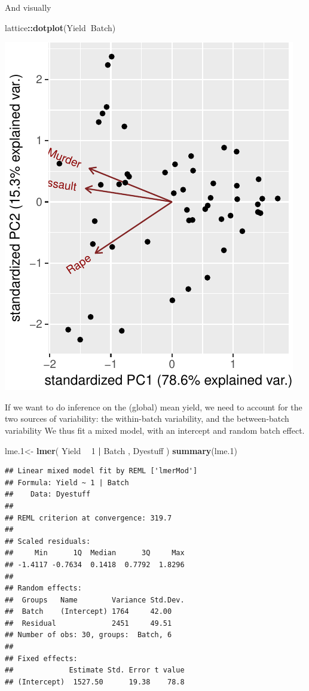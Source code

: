 \documentclass[]{book}
\newenvironment{Shaded}{\begin{snugshade}}{\end{snugshade}}
\newcommand{\DecValTok}[1]{\textcolor[rgb]{0.00,0.00,0.81}{#1}}
\newcommand{\FloatTok}[1]{\textcolor[rgb]{0.00,0.00,0.81}{#1}}
\newcommand{\KeywordTok}[1]{\textcolor[rgb]{0.13,0.29,0.53}{\textbf{#1}}}
\newcommand{\NormalTok}[1]{#1}
\newcommand{\OperatorTok}[1]{\textcolor[rgb]{0.81,0.36,0.00}{\textbf{#1}}}
\newcommand{\StringTok}[1]{\textcolor[rgb]{0.31,0.60,0.02}{#1}}
\theoremstyle{definition}
\theoremstyle{definition}
\theoremstyle{definition}
\theoremstyle{remark}
\begin{document}
And visually

\begin{Shaded}
\begin{Highlighting}[]
\NormalTok{lattice}\OperatorTok{::}\KeywordTok{dotplot}\NormalTok{(Yield}\OperatorTok{~}\NormalTok{Batch)}
\end{Highlighting}
\end{Shaded}

\includegraphics[width=0.5\linewidth]{Rcourse_files/figure-latex/unnamed-chunk-199-1}

If we want to do inference on the (global) mean yield, we need to account for the two sources of variability: the within-batch variability, and the between-batch variability
We thus fit a mixed model, with an intercept and random batch effect.

\begin{Shaded}
\begin{Highlighting}[]
\NormalTok{lme}\FloatTok{.1}\NormalTok{<-}\StringTok{ }\KeywordTok{lmer}\NormalTok{( Yield }\OperatorTok{~}\StringTok{ }\DecValTok{1}  \OperatorTok{|}\StringTok{ }\NormalTok{Batch  , Dyestuff )}
\KeywordTok{summary}\NormalTok{(lme}\FloatTok{.1}\NormalTok{)}
\end{Highlighting}
\end{Shaded}

\begin{verbatim}
## Linear mixed model fit by REML ['lmerMod']
## Formula: Yield ~ 1 | Batch
##    Data: Dyestuff
## 
## REML criterion at convergence: 319.7
## 
## Scaled residuals: 
##     Min      1Q  Median      3Q     Max 
## -1.4117 -0.7634  0.1418  0.7792  1.8296 
## 
## Random effects:
##  Groups   Name        Variance Std.Dev.
##  Batch    (Intercept) 1764     42.00   
##  Residual             2451     49.51   
## Number of obs: 30, groups:  Batch, 6
## 
## Fixed effects:
##             Estimate Std. Error t value
## (Intercept)  1527.50      19.38    78.8
\end{verbatim}
\end{document}
